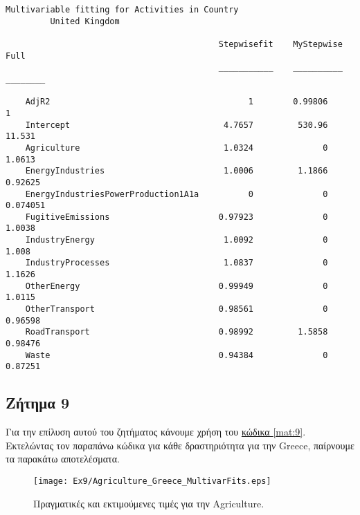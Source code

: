 \documentclass[11pt]{scrartcl} %
\begin{document}
\begin{Verbatim}[fontsize=\small]
Multivariable fitting for Activities in Country
 	 	 United Kingdom

                                           Stepwisefit    MyStepwise      Full  
                                           ___________    __________    ________

    AdjR2                                        1        0.99806              1
    Intercept                               4.7657         530.96         11.531
    Agriculture                             1.0324              0         1.0613
    EnergyIndustries                        1.0006         1.1866        0.92625
    EnergyIndustriesPowerProduction1A1a          0              0       0.074051
    FugitiveEmissions                      0.97923              0         1.0038
    IndustryEnergy                          1.0092              0          1.008
    IndustryProcesses                       1.0837              0         1.1626
    OtherEnergy                            0.99949              0         1.0115
    OtherTransport                         0.98561              0        0.96598
    RoadTransport                          0.98992         1.5858        0.98476
    Waste                                  0.94384              0        0.87251
\end{Verbatim}














\subsection{Ζήτημα 9}
\label{subsec:z9}

Για την επίλυση αυτού του ζητήματος κάνουμε χρήση του \hyperref[mat:9]{κώδικα \ref*{mat:9}}. Εκτελώντας τον παραπάνω κώδικα για κάθε δραστηριότητα για την Greece, παίρνουμε τα παρακάτω αποτελέσματα.






\begin{figure}[H]

	\centering
	\texttt{[image: Ex9/Agriculture\_Greece\_MultivarFits.eps]}	
\caption{Πραγματικές και εκτιμούμενες τιμές για την Agriculture.}
\label{fig:z91} 
\end{figure}
\end{document}
